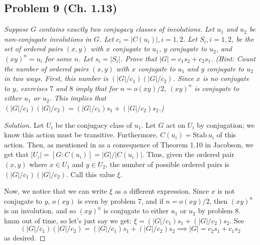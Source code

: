 \documentclass{article}
\begin{document}
\subsection*{Problem 9 (Ch. 1.13)}
{\it Suppose $G$ contains exactly two conjugacy classes of involutions.
Let $u_1$ and $u_2$ be non-conjugate involutions in $G$.
Let $c_i = |C(u_i)|, i =1,2$.
Let $S_i, i=1,2$, be the set of ordered pairs $(x,y)$ with
$x$ conjugate to $u_1$, $y$ conjugate to $u_2$, and $(xy)^n = u_i$ for some $n$.
Let $s_i = |S_i|$. Prove that $|G| = c_1s_2 + c_2s_1$.
(\emph{Hint}: Count the number of ordered pairs $(x,y)$
with $x$ conjugate to $u_1$ and $y$ conjugate to $u_2$ in two ways.
First, this number is $(|G|/c_1)(|G|/c_2)$.
Since $x$ is no conjugate to $y$, exercises $7$ and $8$ imply that
for $n = o(xy)/2$, $(xy)^n$ is conjugate to either $u_1$ or $u_2$.
This implies that $(|G|/c_1)(|G|/c_2) = (|G|/c_1)s_1 + (|G|/c_2)s_2$.)}
\begin{proof}[Solution]\let\qed\relax
	Let $U_i$ be the conjugacy class of $u_1$.
	Let $G$ act on $U_i$ by conjugation;
	we know this action must be transitive.
	Furthermore, $C(u_i) = \mathrm{Stab}\, u_i$ of this action.
	Then, as mentioned in as a consequence of Theorem 1.10 in Jacobson,
	we get that $|U_i| = [G : C(u_i)] = |G|/|C(u_i)|$.
	Thus, given the ordered pair $(x,y)$ where $x \in U_1$ and $y \in U_2$,
	the number of possible ordered pairs is $(|G|/c_1)(|G|/c_2)$.
	Call this value $\xi$.

	Now, we notice that we can write $\xi$ as a different expression.
	Since $x$ is not conjugate to $y$, $o(xy)$ is even by problem 7,
	and if $n = o(xy)/2$, then $(xy)^n$ is an involution, and so
	$(xy)^n$ is conjugate to either $u_1$ or $u_2$ by problem 8.
	hmm out of time, so let's just say we get:
	$\xi = (|G|/c_1)s_1 + (|G|/c_2)s_2$.
	See
	\[
		(|G|/c_1)(|G|/c_2) = (|G|/c_1)s_1 + (|G|/c_2)s_2
		\implies |G| = c_2s_1 + c_1s_2
	\]
	as desired.
\end{proof}
\end{document}
